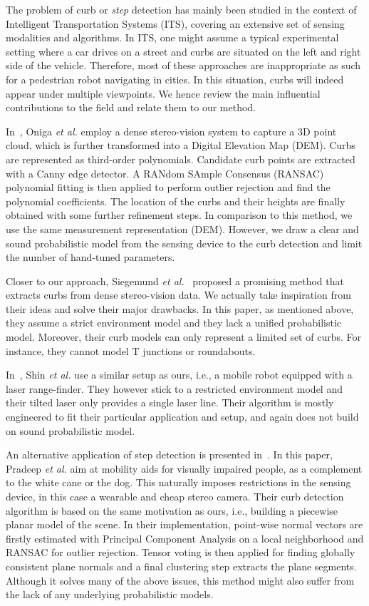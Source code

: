 The problem of curb or \emph{step} detection has mainly been studied in the
context of Intelligent Transportation Systems (ITS), covering an extensive set
of sensing modalities and algorithms. In ITS, one might assume a typical
experimental setting where a car drives on a street and curbs are situated on
the left and right side of the vehicle. Therefore, most of these approaches
are inappropriate as such for a pedestrian robot navigating in cities. In this
situation, curbs will indeed appear under multiple viewpoints. We hence review
the main influential contributions to the field and relate them to our method.

In~\cite{oniga10polynomial}, Oniga \emph{et al.} employ a dense stereo-vision
system to capture a 3D point cloud, which is further transformed into a Digital
Elevation Map (DEM). Curbs are represented as third-order polynomials. Candidate
curb points are extracted with a Canny edge detector. A RANdom SAmple Consensus
(RANSAC) polynomial fitting is then applied to perform outlier rejection and
find the polynomial coefficients. The location of the curbs and their heights
are finally obtained with some further refinement steps. In comparison to this
method, we use the same measurement representation (DEM). However, we draw a
clear and sound probabilistic model from the sensing device to the curb
detection and limit the number of hand-tuned parameters.

Closer to our approach, Siegemund \emph{et al.}~\cite{siegemund10curb} proposed
a promising method that extracts curbs from dense stereo-vision data. We
actually take inspiration from their ideas and solve their major drawbacks. In
this paper, as mentioned above, they assume a strict environment model and they
lack a unified probabilistic model. Moreover, their curb models can only
represent a limited set of curbs. For instance, they cannot model T
junctions or roundabouts.

In~\cite{shin10drivable}, Shin \emph{et al.} use a similar setup as ours, i.e.,
a mobile robot equipped with a laser range-finder. They however stick to a
restricted environment model and their tilted laser only provides a single laser
line. Their algorithm is mostly engineered to fit their particular application
and setup, and again does not build on sound probabilistic model.

An alternative application of step detection is presented
in~\cite{pradeep08piece}. In this paper, Pradeep \emph{et al.} aim at mobility
aids for visually impaired people, as a complement to the white cane or the dog.
This naturally imposes restrictions in the sensing device, in this case a
wearable and cheap stereo camera. Their curb detection algorithm is based on the
same motivation as ours, i.e., building a piecewise planar model of the scene.
In their implementation, point-wise normal vectors are firstly estimated with
Principal Component Analysis on a local neighborhood and RANSAC for outlier
rejection. Tensor voting is then applied for finding globally consistent plane
normals and a final clustering step extracts the plane segments. Although it
solves many of the above issues, this method might also suffer from the lack of
any underlying probabilistic models.

